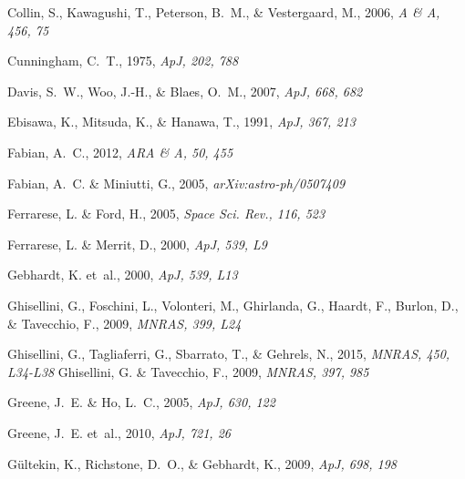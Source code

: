 \documentclass{aa}
\begin{document}
\begin{thebibliography}{}
Collin, S., Kawagushi, T., Peterson, B.~M., \& Vestergaard, M., 2006,
\newblock \emph{A \& A, 456, 75}

Cunningham, C.~T., 1975,
\newblock \emph{ApJ, 202, 788}

Davis, S.~W., Woo, J.-H., \& Blaes, O.~M., 2007,
\newblock \emph{ApJ, 668, 682}

Ebisawa, K., Mitsuda, K., \& Hanawa, T., 1991,
\newblock \emph{ApJ, 367, 213}

Fabian, A.~C., 2012,
\newblock \emph{ARA \& A, 50, 455}

Fabian, A.~C. \& Miniutti, G., 2005,
\newblock \emph{arXiv:astro-ph/0507409}

Ferrarese, L. \& Ford, H., 2005,
\newblock \emph{Space Sci. Rev., 116, 523}

Ferrarese, L. \& Merrit, D., 2000,
\newblock \emph{ApJ, 539, L9}

Gebhardt, K. et~al., 2000,
\newblock \emph{ApJ, 539, L13}

Ghisellini, G., Foschini, L., Volonteri, M., Ghirlanda, G., Haardt, F., Burlon,
  D., \& Tavecchio, F., 2009,
\newblock \emph{MNRAS, 399, L24}

Ghisellini, G., Tagliaferri, G., Sbarrato, T., \& Gehrels, N., 2015,
\newblock \emph{MNRAS, 450, L34-L38}
Ghisellini, G. \& Tavecchio, F., 2009,
\newblock \emph{MNRAS, 397, 985}

Greene, J.~E. \& Ho, L.~C., 2005,
\newblock \emph{ApJ, 630, 122}

Greene, J.~E. et~al., 2010,
\newblock \emph{ApJ, 721, 26}

G{\"u}ltekin, K., Richstone, D.~O., \& Gebhardt, K., 2009,
\newblock \emph{ApJ, 698, 198}


\end{thebibliography}
\end{document}
